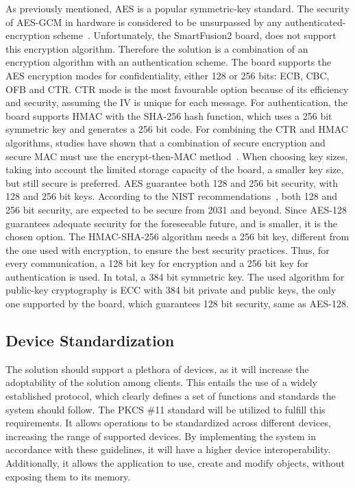 As previously mentioned, \ac{AES} is a popular symmetric-key standard. The security of \ac{AES}-\ac{GCM} in hardware is considered to be unsurpassed by any authenticated-encryption scheme~\cite{aesmodes}.
Unfortunately, the SmartFusion2 board, does not support this encryption algorithm. Therefore the solution is a combination of an encryption algorithm with an authentication scheme. The board supports the \ac{AES} encryption modes for confidentiality, either 128 or 256 bits: \ac{ECB}, \ac{CBC}, \ac{OFB} and \ac{CTR}. CTR mode is the most favourable option because of its efficiency and security, assuming the IV is unique for each message.
For authentication, the board supports \ac{HMAC} with the \ac{SHA}-256 hash function, which uses a 256 bit symmetric key and generates a 256 bit code. For combining the CTR and HMAC algorithms, studies have shown that a combination of secure encryption and secure MAC must use the encrypt-then-MAC method~\cite{encryptmacorder}.
When choosing key sizes, taking into account the limited storage capacity of the board, a smaller key size, but still secure is preferred. \ac{AES} guarantee both 128 and 256 bit security, with 128 and 256 bit keys. According to the \ac{NIST} recommendations~\cite{nistRecommendations}, both 128 and 256 bit security, are expected to be secure from 2031 and beyond. Since \ac{AES}-128 guarantees adequate security for the foreseeable future, and is smaller, it is the chosen option.
The \ac{HMAC}-\ac{SHA}-256 algorithm needs a 256 bit key, different from the one used with encryption, to ensure the best security practices. Thus, for every communication, a 128 bit key for encryption and a 256 bit key for authentication is used. In total, a 384 bit symmetric key.
The used algorithm for public-key cryptography is \ac{ECC} with 384 bit private and public keys, the only one supported by the board, which guarantees 128 bit security, same as \ac{AES}-128.

\subsection{Device Standardization}\label{chap:implementation:tools:standardization}

The solution should support a plethora of devices, as it will increase the adoptability of the solution among clients. This entails the use of a widely established protocol, which clearly defines a set of functions and standards the system should follow.
The \ac{PKCS} \#11 standard will be utilized to fulfill this requirements. It allows operations to be standardized across different devices, increasing the range of supported devices. By implementing the system in accordance with these guidelines, it will have a higher device interoperability. Additionally, it allows the application to use, create and modify objects, without exposing them to its memory.

